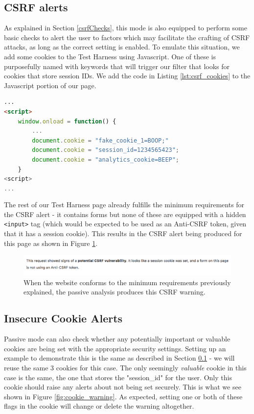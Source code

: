 \subsection{CSRF alerts} \label{applications_CSRF_alerts}

As explained in Section \ref{csrfChecks}, this mode is also equipped to perform some basic checks to alert the user to factors which may facilitate the crafting of CSRF attacks, as long as the correct setting is enabled. To emulate this situation, we add some cookies to the Test Harness using Javascript. One of these is purposefully named with keywords that will trigger our filter that looks for cookies that store session IDs. We add the code in Listing \ref{lst:csrf_cookies} to the Javascript portion of our page.

\begin{lstlisting}[label={lst:csrf_cookies}, language={HTML}, caption={We add some cookies to the page - one of these is designed to trigger our filter to find Session ID related cookies}]
...
<script>
	window.onload = function() {
		...
		document.cookie = "fake_cookie_1=BOOP;"
		document.cookie = "session_id=1234565423";
		document.cookie = "analytics_cookie=BEEP";
	}
<script>
...
\end{lstlisting}

The rest of our Test Harness page already fulfills the minimum requirements for the CSRF alert - it contains forms but none of these are equipped with a hidden \texttt{<input>} tag (which would be expected to be used as an Anti-CSRF token, given that it has a session cookie). This results in the CSRF alert being produced for this page as shown in Figure \ref{fig:csrf_warning}.

\begin{figure}[h!]
	\centering
	\includegraphics[width=\textwidth]{images/csrf_warning.png}
	\caption{When the website conforms to the minimum requirements previously explained, the passive analysis produces this CSRF warning.}
	\label{fig:csrf_warning}
\end{figure}

\subsection{Insecure Cookie Alerts}

Passive mode can also check whether any potentially important or valuable cookies are being set with the appropriate security settings. Setting up an example to demonstrate this is the same as described in Section \ref{applications_CSRF_alerts} - we will reuse the same 3 cookies for this case. The only seemingly \textit{valuable} cookie in this case is the same, the one that stores the "session\_id" for the user. Only this cookie should raise any alerts about not being set securely. This is what we see shown in Figure \ref{fig:cookie_warning}. As expected, setting one or both of these flags in the cookie will change or delete the warning altogether.  \\

